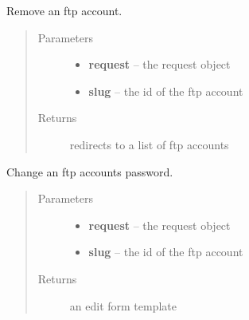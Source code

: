 \documentclass[letterpaper,10pt,english]{sphinxmanual}
\begin{document}

\begin{fulllineitems}
\label{api/ftp:limeade.ftp.views.account_delete}
Remove an ftp account.
\begin{quote}\begin{description}
\item[{Parameters}] \leavevmode\begin{itemize}
\item {} 
\textbf{request} -- the request object

\item {} 
\textbf{slug} -- the id of the ftp account

\end{itemize}

\item[{Returns}] \leavevmode
redirects to a list of ftp accounts

\end{description}\end{quote}

\end{fulllineitems}


\begin{fulllineitems}
\label{api/ftp:limeade.ftp.views.account_edit}
Change an ftp accounts password.
\begin{quote}\begin{description}
\item[{Parameters}] \leavevmode\begin{itemize}
\item {} 
\textbf{request} -- the request object

\item {} 
\textbf{slug} -- the id of the ftp account

\end{itemize}

\item[{Returns}] \leavevmode
an edit form template

\end{description}\end{quote}

\end{fulllineitems}
\end{document}
